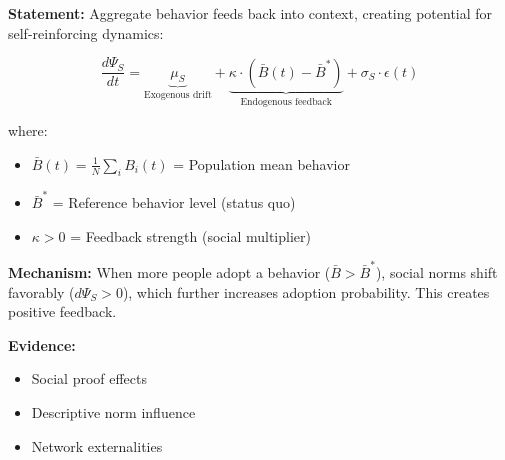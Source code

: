 \documentclass[11pt, a4paper]{article}
\begin{document}
\begin{tcolorbox}[colback=red!5!white, colframe=red!75!black,
    title=\textbf{Axiom NTM-A4: Behavior-Context Feedback Loop}]

\textbf{Statement:} Aggregate behavior feeds back into context, creating potential for self-reinforcing dynamics:

\begin{equation}
\frac{d\Psi_S}{dt} = \underbrace{\mu_S}_{\text{Exogenous drift}} + \underbrace{\kappa \cdot (\bar{B}(t) - \bar{B}^*)}_{\text{Endogenous feedback}} + \sigma_S \cdot \epsilon(t)
\label{eq:feedback-loop}
\end{equation}

where:
\begin{itemize}[nosep]
\item $\bar{B}(t) = \frac{1}{N}\sum_i B_i(t)$ = Population mean behavior
\item $\bar{B}^*$ = Reference behavior level (status quo)
\item $\kappa > 0$ = Feedback strength (social multiplier)
\end{itemize}

\textbf{Mechanism:} When more people adopt a behavior ($\bar{B} > \bar{B}^*$), social norms shift favorably ($d\Psi_S > 0$), which further increases adoption probability. This creates positive feedback.

\textbf{Evidence:}
\begin{itemize}[nosep]
\item Social proof effects \citep{cialdini2004social}
\item Descriptive norm influence \citep{bicchieri2005grammar}
\item Network externalities \citep{PAP-rogers2003diffusion}
\end{itemize}

\end{tcolorbox}
\end{document}
